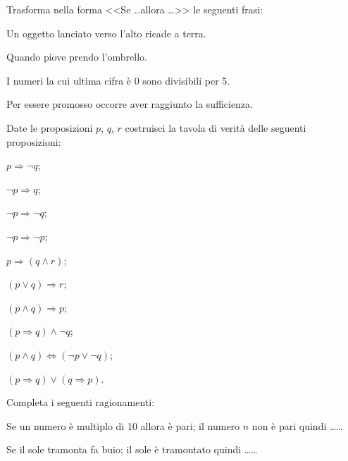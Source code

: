 \begin{esercizio}
\label{ese:\thechapter.13}
Trasforma nella forma <<Se \ldots allora \ldots>> le seguenti frasi:
\begin{enumeratea}
\item Un oggetto lanciato verso l'alto ricade a terra.
\item Quando piove prendo l'ombrello.
\item I numeri la cui ultima cifra è 0 sono divisibili per 5.
\item Per essere promosso occorre aver raggiunto la sufficienza.
\end{enumeratea}
\end{esercizio}

\begin{esercizio}
\label{ese:\thechapter.14}
Date le proposizioni $ p $, $ q $, $ r $ costruisci la tavola di verità delle
seguenti proposizioni:
 \begin{multicols}{2}
 \begin{enumeratea}
 \item $p\Rightarrow \neg q$;
 \item $\neg p\Rightarrow q$;
 \item $\neg p\Rightarrow \neg q$;
 \item $\neg p\Rightarrow \neg p$;
 \item $p\Rightarrow (q\wedge r)$;
 \item $(p\vee q)\Rightarrow r$;
 \item $(p\wedge q)\Rightarrow p$;
 \item $(p\Rightarrow q)\wedge \neg q$;
 \item $(p\wedge q)\Leftrightarrow (\neg p\vee \neg q)$;
 \item $(p\Rightarrow q)\vee (q\Rightarrow p)$.
 \end{enumeratea}
 \end{multicols}
\end{esercizio}

\begin{esercizio}
\label{ese:\thechapter.15}
Completa i seguenti ragionamenti:
\begin{enumeratea}
\item Se un numero è multiplo di 10 allora è pari; il numero $ n $ non è pari quindi \ldots \ldots
\item Se il sole tramonta fa buio; il sole è tramontato quindi \ldots \ldots
\end{enumeratea}
\end{esercizio}


